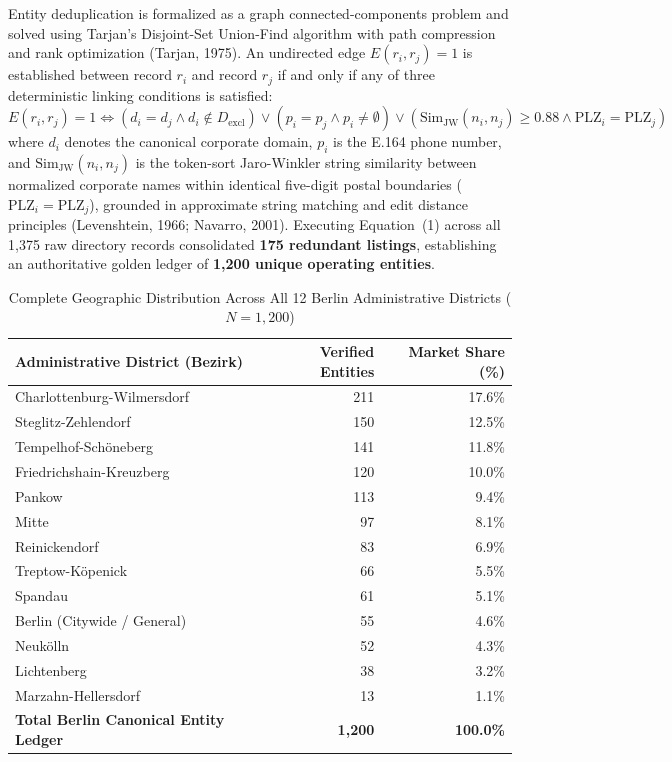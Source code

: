 \documentclass[11pt,a4paper]{article}
\begin{document}
Entity deduplication is formalized as a graph connected-components problem and solved using Tarjan's Disjoint-Set Union-Find algorithm with path compression and rank optimization (Tarjan, 1975). An undirected edge $E(r_i, r_j) = 1$ is established between record $r_i$ and record $r_j$ if and only if any of three deterministic linking conditions is satisfied:
\begin{equation}
E(r_i, r_j) = 1 \iff \left(d_i = d_j \land d_i \notin D_{\text{excl}}\right) \lor \left(p_i = p_j \land p_i \neq \emptyset\right) \lor \left(\text{Sim}_{\text{JW}}(n_i, n_j) \ge 0.88 \land \text{PLZ}_i = \text{PLZ}_j\right)
\end{equation}
where $d_i$ denotes the canonical corporate domain, $p_i$ is the E.164 phone number, and $\text{Sim}_{\text{JW}}(n_i, n_j)$ is the token-sort Jaro-Winkler string similarity between normalized corporate names within identical five-digit postal boundaries ($\text{PLZ}_i = \text{PLZ}_j$), grounded in approximate string matching and edit distance principles (Levenshtein, 1966; Navarro, 2001). Executing Equation~(1) across all 1,375 raw directory records consolidated \textbf{175 redundant listings}, establishing an authoritative golden ledger of \textbf{1,200 unique operating entities}.

\begin{table}[htbp]
\centering
\caption{Complete Geographic Distribution Across All 12 Berlin Administrative Districts ($N = 1,200$)}
\label{tab:districts}
\footnotesize
\begin{tabularx}{\textwidth}{l r r}
\toprule
\textbf{Administrative District (Bezirk)} & \textbf{Verified Entities} & \textbf{Market Share (\%)} \\
\midrule
Charlottenburg-Wilmersdorf & 211 & 17.6\% \\
Steglitz-Zehlendorf & 150 & 12.5\% \\
Tempelhof-Sch\"oneberg & 141 & 11.8\% \\
Friedrichshain-Kreuzberg & 120 & 10.0\% \\
Pankow & 113 & 9.4\% \\
Mitte & 97 & 8.1\% \\
Reinickendorf & 83 & 6.9\% \\
Treptow-K\"openick & 66 & 5.5\% \\
Spandau & 61 & 5.1\% \\
Berlin (Citywide / General) & 55 & 4.6\% \\
Neuk\"olln & 52 & 4.3\% \\
Lichtenberg & 38 & 3.2\% \\
Marzahn-Hellersdorf & 13 & 1.1\% \\
\midrule
\textbf{Total Berlin Canonical Entity Ledger} & \textbf{1,200} & \textbf{100.0\%} \\
\bottomrule
\end{tabularx}
\end{table}
\end{document}
